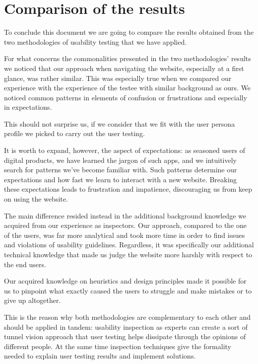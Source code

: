 \section{Comparison of the results}
To conclude this document we are going to compare the results obtained from the two methodologies of usability testing that we have applied.

For what concerns the commonalities presented in the two methodologies' results we noticed that our approach when navigating the website, especially at a first glance, was rather similar. This was especially true when we compared our experience with the experience of the testee with similar background as ours. We noticed common patterns in elements of confusion or frustrations and especially in expectations.

 This should not surprise us, if we consider that we fit with the user persona profile we picked to carry out the user testing.

It is worth to expand, however, the aspect of expectations: as seasoned users of digital products, we have learned the jargon of such apps, and we intuitively search for patterns we've become familiar with. Such patterns determine our expectations and how fast we learn to interact with a new website. Breaking these expectations leads to frustration and impatience, discouraging us from keep on using the website.


The main difference resided instead in the  additional background knowledge we acquired from our experience as inspectors. Our approach, compared to the one of the users, was far more analytical and took more time in order to find issues and violations of usability guidelines. Regardless, it was specifically our additional technical knowledge that made us judge the website more harshly with respect to the end users.

Our acquired knowledge on heuristics and design principles made it possible for us to pinpoint what exactly caused the users to struggle and make mistakes or to give up altogether.

This is the reason why both methodologies are complementary to each other and should be applied in tandem: usability inspection as experts can create a sort of tunnel vision approach that user testing helps dissipate through the opinions of different people. At the same time inspection techniques give the formality needed to explain user testing results and implement solutions.

